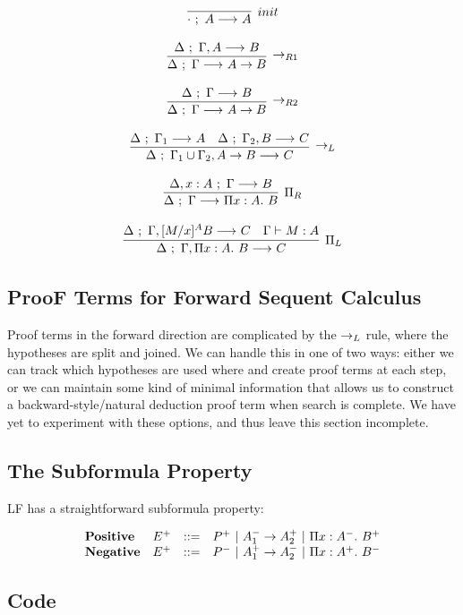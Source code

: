 \documentclass[11pt,twoside]{article}
\begin{document}
$$
\begin{array}{c}
\infer[init]{\Sequent{\cdot}{A}{A}}{} \\\\
\infer[\LFArr_{R1}]{\Sequent{\Delta}{\Gamma}{A\LFArr B}}
                  {\Sequent{\Delta}{\Gamma,A}{B}} \\\\
\infer[\LFArr_{R2}]{\Sequent{\Delta}{\Gamma}{A\LFArr B}}
                  {\Sequent{\Delta}{\Gamma}{B}} \\\\
\infer[\LFArr_L]{\Sequent{\Delta}{\Gamma_1\cup\Gamma_2,A\LFArr B}{C}}
                {\Sequent{\Delta}{\Gamma_1}{A} & 
                 \Sequent{\Delta}{\Gamma_2,B}{C}}\\\\
\infer[\Pi_R]{\Sequent{\Delta}{\Gamma}{\PiTyp{x}{A}{B}}}
             {\Sequent{\Delta,x:A}{\Gamma}{B}} \\\\
\infer[\Pi_L]{\Sequent{\Delta}{\Gamma,\PiTyp{x}{A}{B}}{C}}
             {\Sequent{\Delta}{\Gamma,\HSub{M}{x}{A}{B}}{C} & 
              \Gamma \vdash M : A}
\end{array} 
$$

\subsection{ProoF Terms for Forward Sequent Calculus}

Proof terms in the forward direction are complicated by the
$\to_L$ rule, where the hypotheses are split and joined.
We can handle this in one of two ways: either we can
track which hypotheses are used where and create proof terms
at each step, or we can maintain some kind of minimal information
that allows us to construct a backward-style/natural deduction
proof term when search is complete.  We have yet to experiment
with these options, and thus leave this section incomplete.

\subsection{The Subformula Property}

LF has a straightforward subformula property:

$$
\begin{array}{llll}
\mathbf{Positive} & E^+ & ::= & P^+ \ |\  A_1^- \to A_2^+ \ |\  \Pi x : A^-.\ B^+\\
\mathbf{Negative} & E^+ & ::= & P^- \ |\  A_1^+ \to A_2^- \ |\  \Pi x : A^+.\ B^-\\
\end{array} 
$$



\subsection{Code}









\end{document}
